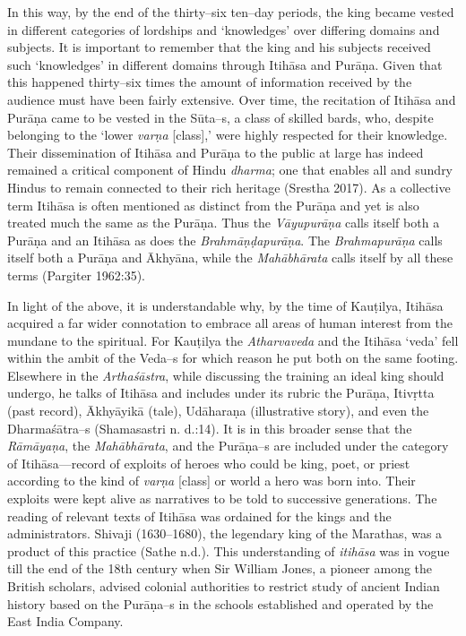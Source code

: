 In this way, by the end of the thirty–six ten–day periods, the king became vested in different categories of lordships and ‘knowledges’ over differing domains and subjects. It is important to remember that the king and his subjects received such ‘knowledges’ in different domains through Itihāsa and Purāṇa. Given that this happened thirty–six times the amount of information received by the audience must have been fairly extensive. Over time, the recitation of Itihāsa and Purāṇa came to be vested in the Sūta–s, a class of skilled bards, who, despite belonging to the ‘lower \textit{varṇa} [class],’ were highly respected for their knowledge. Their dissemination of Itihāsa and Purāṇa to the public at large has indeed remained a critical component of Hindu \textit{dharma}; one that enables all and sundry Hindus to remain connected to their rich heritage (Srestha 2017). As a collective term Itihāsa is often mentioned as distinct from the Purāṇa and yet is also treated much the same as the Purāṇa. Thus the \textit{Vāyupurāṇa} calls itself both a Purāṇa and an Itihāsa as does the \textit{Brahmāṇḍapurāṇa}. The \textit{Brahmapurāṇa} calls itself both a Purāṇa and Ākhyāna, while the \textit{Mahābhārata} calls itself by all these terms (Pargiter 1962:35). 

In light of the above, it is understandable why, by the time of Kauṭilya, Itihāsa acquired a far wider connotation to embrace all areas of human interest from the mundane to the spiritual. For Kauṭilya the \textit{Atharvaveda} and the Itihāsa ‘veda’ fell within the ambit of the Veda–s for which reason he put both on the same footing. Elsewhere in the \textit{Arthaśāstra}, while discussing the training an ideal king should undergo, he talks of Itihāsa and includes under its rubric the Purāṇa, Itivṛtta (past record), Ākhyāyikā (tale), Udāharaṇa (illustrative story), and even the Dharmaśātra–s (Shamasastri n. d.:14). It is in this broader sense that the \textit{Rāmāyaṇa}, the \textit{Mahābhārata}, and the Purāṇa–s are included under the category of Itihāsa—record of exploits of heroes who could be king, poet, or priest according to the kind of \textit{varṇa} [class] or world a hero was born into. Their exploits were kept alive as narratives to be told to successive generations. The reading of relevant texts of Itihāsa was ordained for the kings and the administrators. Shivaji (1630–1680), the legendary king of the Marathas, was a product of this practice (Sathe n.d.). This understanding of \textit{itihāsa} was in vogue till the end of the 18th century when Sir William Jones, a pioneer among the British scholars, advised colonial authorities to restrict study of ancient Indian history based on the Purāṇa–s in the schools established and operated by the East India Company.


